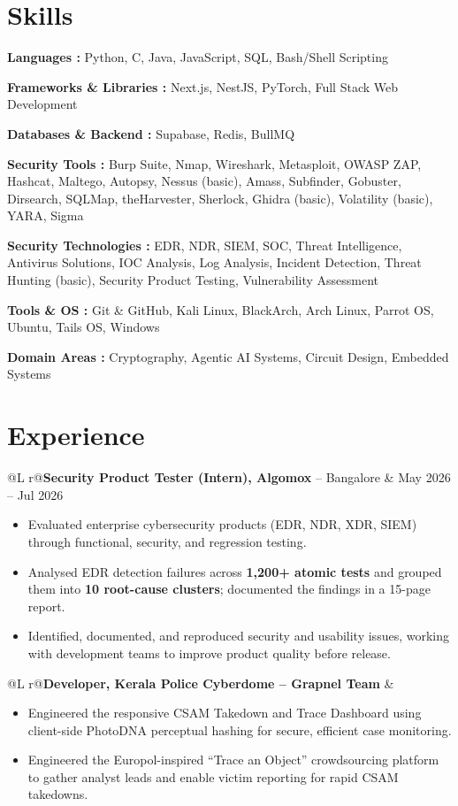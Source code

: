 \documentclass[10pt, a4paper]{article}
\makeatletter
\newenvironment{highlights}{
    \begin{itemize}[topsep=0.10cm, parsep=0.10cm, partopsep=0pt, itemsep=0pt, leftmargin=10pt]
}{
    \end{itemize}
}
\newcommand{\entry}[2]{%
    \par\vspace{0.2cm}\noindent
    \begin{tabularx}{\textwidth}{@{}L r@{}}#1 & #2\end{tabularx}%
    \par\nopagebreak
}
\newcommand{\skillrow}[2]{\par\vspace{0.1cm}\noindent\textbf{#1 :} #2\par}
\makeatother
\begin{document}
\section{Skills}
\skillrow{Languages}{Python, C, Java, JavaScript, SQL, Bash/Shell Scripting}
\skillrow{Frameworks \& Libraries}{Next.js, NestJS, PyTorch, Full Stack Web Development}
\skillrow{Databases \& Backend}{Supabase, Redis, BullMQ}
\skillrow{Security Tools}{Burp Suite, Nmap, Wireshark, Metasploit, OWASP ZAP, Hashcat, Maltego, Autopsy, Nessus (basic), Amass, Subfinder, Gobuster, Dirsearch, SQLMap, theHarvester, Sherlock, Ghidra (basic), Volatility (basic), YARA, Sigma}
\skillrow{Security Technologies}{EDR, NDR, SIEM, SOC, Threat Intelligence, Antivirus Solutions, IOC Analysis, Log Analysis, Incident Detection, Threat Hunting (basic), Security Product Testing, Vulnerability Assessment}
\skillrow{Tools \& OS}{Git \& GitHub, Kali Linux, BlackArch, Arch Linux, Parrot OS, Ubuntu, Tails OS, Windows}
\skillrow{Domain Areas}{Cryptography, Agentic AI Systems, Circuit Design, Embedded Systems}

\section{Experience}
\entry{\textbf{Security Product Tester (Intern), Algomox} -- Bangalore}{May 2026 -- Jul 2026}
\begin{highlights}
    \item Evaluated enterprise cybersecurity products (EDR, NDR, XDR, SIEM) through functional, security, and regression testing.
    \item Analysed EDR detection failures across \textbf{1,200+ atomic tests} and grouped them into \textbf{10 root-cause clusters}; documented the findings in a 15-page report.
    \item Identified, documented, and reproduced security and usability issues, working with development teams to improve product quality before release.
\end{highlights}

\entry{\textbf{Developer, Kerala Police Cyberdome -- Grapnel Team}}{}
\begin{highlights}
    \item Engineered the responsive CSAM Takedown and Trace Dashboard using client-side PhotoDNA perceptual hashing for secure, efficient case monitoring.
    \item Engineered the Europol-inspired ``Trace an Object'' crowdsourcing platform to gather analyst leads and enable victim reporting for rapid CSAM takedowns.
\end{highlights}
\end{document}
